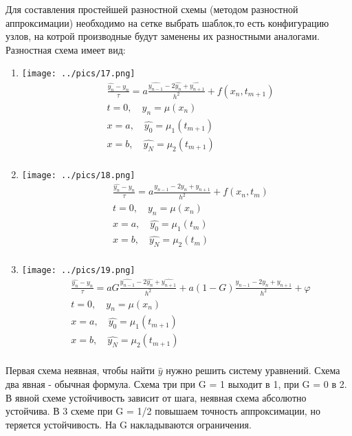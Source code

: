 \documentclass[12pt,a4paper]{article}
\begin{document}
	Для составления простейшей разностной схемы (методом разностной аппроксимации) необходимо на сетке выбрать шаблок,то есть конфигурацию узлов, на котрой производные будут заменены их разностными аналогами. \\
	Разностная схема имеет вид:\\
	\begin{enumerate}
		\item \texttt{[image: ../pics/17.png]}\\
		\begin{align*}
		&\frac{\hat{y_n} - y_n}{\tau} = a \frac{\hat{y_{n-1}} - 2\hat{y_n} + \hat{y_{n+1}} }{h^2} + f(x_n, t_{m+1})\\
		&t=0, \quad y_n = \mu(x_n)\\
		&x=a, \quad \hat{y_0} = \mu_1(t_{m+1})\\
		&x=b, \quad \hat{y_N} = \mu_2(t_{m+1})\\
		\end{align*}
		\item \texttt{[image: ../pics/18.png]}\\
		\begin{align*}
		&\frac{\hat{y_n} - y_n}{\tau} = a \frac{y_{n-1} - 2y_n + y_{n+1} }{h^2} + f(x_n, t_m)\\
		&t=0, \quad y_n = \mu(x_n)\\
		&x=a, \quad \hat{y_0} = \mu_1(t_{m})\\
		&x=b, \quad \hat{y_N} = \mu_2(t_{m})\\
		\end{align*}
		\item \texttt{[image: ../pics/19.png]}\\
		\begin{align*}
		&\frac{\hat{y_n} - y_n}{\tau} = a G \frac{\hat{y_{n-1}} - 2\hat{y_n} + \hat{y_{n+1}} }{h^2} + a(1-G) \frac{y_{n-1} - 2y_n + y_{n+1} }{h^2}+\varphi \\
		&t=0, \quad y_n = \mu(x_n)\\
		&x=a, \quad \hat{y_0} = \mu_1(t_{m+1})\\
		&x=b, \quad \hat{y_N} = \mu_2(t_{m+1})\\
		\end{align*}
	\end{enumerate}
	Первая схема неявная, чтобы найти $\hat{y}$ нужно решить систему уравнений. Схема два явная - обычная формула. Схема три при G = 1 выходит в 1, при G = 0 в 2. В явной схеме устойчивость зависит от шага, неявная схема абсолютно устойчива. В 3 схеме при G = 1/2 повышаем точность аппроксимации, но теряется устойчивость. На G накладываются ограничения. 
\end{document}
